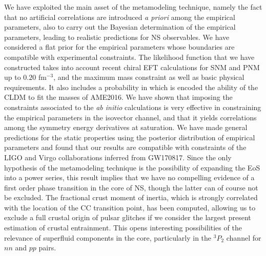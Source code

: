 We have exploited the main asset of the metamodeling technique, namely the 
fact that no artificial correlations are introduced \textit{a priori} among the 
empirical parameters, also to carry out the Bayesian determination of the 
empirical parameters, leading to realistic predictions for NS observables. We 
have considered a flat prior for the empirical parameters whose boundaries are
compatible with experimental constraints. 
The likelihood function that we have constructed takes into account recent 
chiral EFT calculations for SNM and PNM up to $0.20$ fm$^{-3}$, and 
the maximum mass constraint as well as basic physical requirements. 
It also includes a probability in which is encoded the ability of the CLDM to 
fit the masses of AME2016. We have shown that imposing the constraints
associated to the \textit{ab initio} calculations is very effective in 
constraining the empirical parameters in the isovector channel, and that it 
yields correlations among the symmetry energy derivatives at saturation.
We have made general predictions for the static properties using the posterior 
distribution of empirical parameters and found that our results are compatible 
with constraints of the LIGO and Virgo collaborations inferred from GW170817.
%
{Since the only hypothesis of the metamodeling technique is the 
  possibility of expanding the EoS into a power series, this result implies 
  that we have no compelling evidence of a first order phase transition in the 
  core of NS, though the latter can of course not be excluded.}
%
The fractional crust moment of inertia, which is strongly correlated with the 
location of the CC transition point, has been computed, allowing us to exclude 
a full crustal origin of pulsar glitches if we consider the largest present 
estimation of crustal entrainment. This opens interesting possibilities of the
relevance of superfluid components in the core, particularly in the $^3P_2$
channel for $nn$ and $pp$ pairs.

